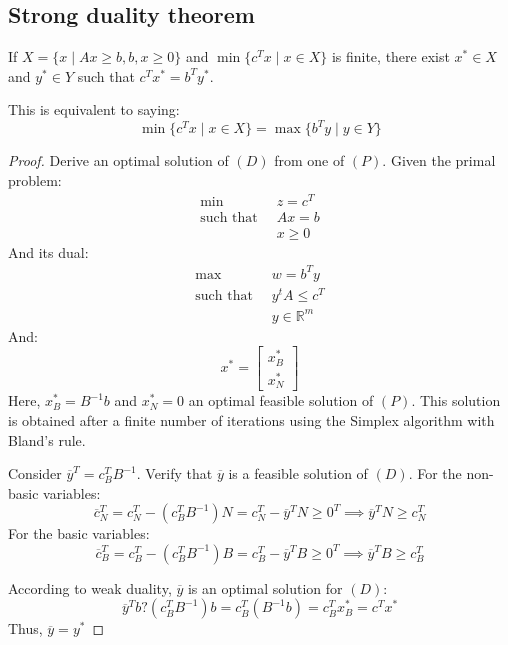 \subsection{Strong duality theorem}
\begin{theorem}
    If $X=\{x\mid Ax \geq b, b,x \geq 0\}$ and $\min\{c^Tx\mid x \in X\}$ is finite, there exist $x^{\ast} \in X$ and $y^{\ast} \in Y$ such that $c^Tx^{\ast}=b^Ty^{\ast}$. 
\end{theorem}
This is equivalent to saying:
\[\min\{c^Tx\mid x \in X\}=\max\{b^Ty\mid y \in Y\}\]
\begin{proof}
    Derive an optimal solution of $(D)$ from one of $(P)$.
    Given the primal problem: 
    \begin{align*}
        \min                      \:&\: z=c^T            \\
        \text{such that }     &\: Ax = b         \\
                                    &\: x \geq 0
    \end{align*}
    And its dual: 
    \begin{align*}
        \max                      \:&\: w=b^Ty              \\
        \text{such that }     &\: y^tA \leq c^T       \\
                                    &\: y \in \mathbb{R}^m
    \end{align*}
    And: 
    \[x^{\ast}=\begin{bmatrix}
        x^{\ast}_B \\ 
        x^{\ast}_N
    \end{bmatrix}\]
    Here, $x^{\ast}_B=B^{-1}b$ and $x^{\ast}_N=0$ an optimal feasible solution of $(P)$. 
    This solution is obtained after a finite number of iterations using the Simplex algorithm with Bland's rule.  

    Consider $\overline{y}^T=c_B^TB^{-1}$.
    Verify that $\overline{y}$ is a feasible solution of $(D)$. 
    For the non-basic variables: 
    \[\overline{c}_N^T=c_N^T-(c_B^TB^{-1})N=c_N^T-\overline{y}^TN \geq 0^T \implies \overline{y}^TN \geq c_N^T\]
    For the basic variables: 
    \[\overline{c}_B^T=c_B^T-(c_B^TB^{-1})B=c_B^T-\overline{y}^TB \geq 0^T \implies \overline{y}^TB \geq c_B^T\]
    
    According to weak duality, $\overline{y}$ is an optimal solution for $(D)$: 
    \[\overline{y}^Tb?(c_B^TB^{-1})b=c_B^T(B^{-1}b)=c_B^Tx_B^{\ast}=c^Tx^{\ast}\]
    Thus, $\overline{y}=y^{\ast}$
\end{proof}

